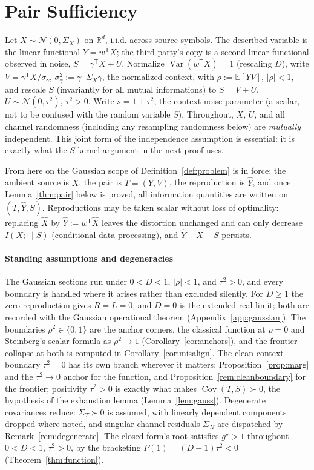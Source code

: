 \documentclass[11pt,onecolumn]{IEEEtran}
\newcommand{\E}{\mathbb{E}}
\newcommand{\R}{\mathbb{R}}
\newcommand{\Cov}{\operatorname{Cov}}
\newcommand{\hX}{\widehat{X}}
\newcommand{\hY}{\widehat{Y}}
\begin{document}
\section{Pair Sufficiency}
\label{sec:pair}

Let $X\sim\mathcal N(0,\Sigma_X)$ on $\R^d$, i.i.d. across source symbols.
The described variable is the linear functional $Y=w^{\mathsf T}X$; the third
party's copy is a second linear functional observed in noise,
$S=\gamma^{\mathsf T}X+U$. Normalize
$\operatorname{Var}(w^{\mathsf T}X)=1$ (rescaling $D$), write
$V=\gamma^{\mathsf T}X/\sigma_{\gamma}$, $\sigma_\gamma^2:=\gamma^{\mathsf T}\Sigma_X\gamma$,
the normalized context, with
$\rho:=\E[YV]$, $|\rho|<1$, and
rescale $S$ (invariantly for all mutual informations) to $S=V+U$,
$U\sim\mathcal N(0,\tau^2)$, $\tau^2>0$. Write $s=1+\tau^2$, the
context-noise parameter (a scalar, not to be confused with the random
variable $S$). Throughout,
$X$, $U$, and all channel randomness (including any resampling randomness
below) are \emph{mutually} independent. This joint form of the independence
assumption is essential: it is exactly what the $S$-kernel argument in
the next proof uses.

From here on the Gaussian scope of Definition~\ref{def:problem} is in
force: the ambient source is $X$, the pair is $T=(Y,V)$, the reproduction
is $\hY$, and once Lemma~\ref{thm:pair} below is proved, all
information quantities are written on $(T,\hY,S)$. Reproductions may be
taken scalar without loss of optimality: replacing
$\hX$ by $\hY:=w^{\mathsf T}\hX$ leaves the distortion unchanged and can
only decrease $I(X;\cdot\mid S)$ (conditional data processing), and
$\hY-X-S$ persists.

\paragraph*{Standing assumptions and degeneracies}
The Gaussian sections run under $0<D<1$, $|\rho|<1$, and $\tau^2>0$, and
every boundary is handled where it arises rather than excluded silently.
For $D\ge1$ the zero reproduction gives $R=L=0$, and $D=0$ is the
extended-real limit; both are recorded with the Gaussian operational
theorem (Appendix~\ref{app:gaussian}). The boundaries $\rho^2\in\{0,1\}$
are the anchor corners, the classical function at $\rho=0$ and
Steinberg's scalar formula as $\rho^2\to1$
(Corollary~\ref{cor:anchors}), and the frontier collapse at both is
computed in Corollary~\ref{cor:misalign}. The clean-context boundary
$\tau^2=0$ has its own branch wherever it matters:
Proposition~\ref{prop:marg} and the $\tau^2\to0$ anchor for the
function, and Proposition~\ref{rem:cleanboundary} for the frontier; positivity
$\tau^2>0$ is exactly what makes $\Cov(T,S)\succ0$, the hypothesis of
the exhaustion lemma (Lemma~\ref{lem:gauss}). Degenerate covariances
reduce: $\Sigma_T\succ0$ is assumed, with linearly dependent components
dropped where noted, and singular channel residuals $\Sigma_N$ are
dispatched by Remark~\ref{rem:degenerate}. The closed form's root satisfies
$g^\star>1$ throughout $0<D<1$, $\tau^2>0$, by the bracketing
$P(1)=(D-1)\tau^2<0$ (Theorem~\ref{thm:function}).
\end{document}
